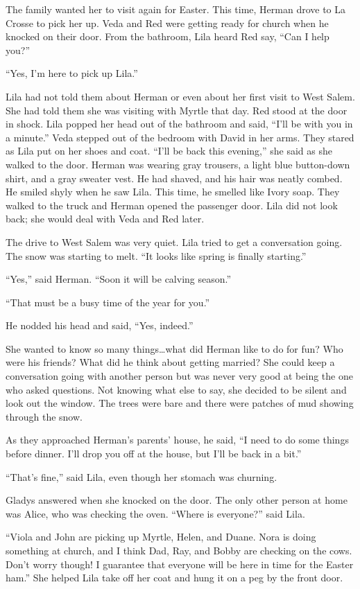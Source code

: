 \documentclass[
  letterpaper,
]{book}
\begin{document}
The family wanted her to visit again for Easter. This time, Herman drove
to La Crosse to pick her up. Veda and Red were getting ready for church
when he knocked on their door. From the bathroom, Lila heard Red say,
``Can I help you?''

``Yes, I'm here to pick up Lila.''

Lila had not told them about Herman or even about her first visit to
West Salem. She had told them she was visiting with Myrtle that day. Red
stood at the door in shock. Lila popped her head out of the bathroom and
said, ``I'll be with you in a minute.'' Veda stepped out of the bedroom
with David in her arms. They stared as Lila put on her shoes and coat.
``I'll be back this evening,'' she said as she walked to the door.
Herman was wearing gray trousers, a light blue button-down shirt, and a
gray sweater vest. He had shaved, and his hair was neatly combed. He
smiled shyly when he saw Lila. This time, he smelled like Ivory soap.
They walked to the truck and Herman opened the passenger door. Lila did
not look back; she would deal with Veda and Red later.

The drive to West Salem was very quiet. Lila tried to get a conversation
going. The snow was starting to melt. ``It looks like spring is finally
starting.''

``Yes,'' said Herman. ``Soon it will be calving season.''

``That must be a busy time of the year for you.''

He nodded his head and said, ``Yes, indeed.''

She wanted to know so many things\ldots what did Herman like to do for
fun? Who were his friends? What did he think about getting married? She
could keep a conversation going with another person but was never very
good at being the one who asked questions. Not knowing what else to say,
she decided to be silent and look out the window. The trees were bare
and there were patches of mud showing through the snow.

As they approached Herman's parents' house, he said, ``I need to do some
things before dinner. I'll drop you off at the house, but I'll be back
in a bit.''

``That's fine,'' said Lila, even though her stomach was churning.

Gladys answered when she knocked on the door. The only other person at
home was Alice, who was checking the oven. ``Where is everyone?'' said
Lila.

``Viola and John are picking up Myrtle, Helen, and Duane. Nora is doing
something at church, and I think Dad, Ray, and Bobby are checking on the
cows. Don't worry though! I guarantee that everyone will be here in time
for the Easter ham.'' She helped Lila take off her coat and hung it on a
peg by the front door.
\end{document}
